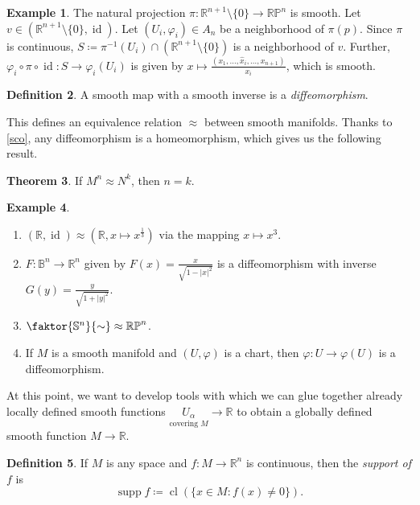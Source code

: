 \documentclass[10pt,letterpaper,cm]{nupset}
\theoremstyle{definition}
\newtheorem{definition}{Definition}[subsection]
\newtheorem{exmp}[definition]{Example}
\theoremstyle{theorem}
\newtheorem{theorem}[definition]{Theorem}
\theoremstyle{remark}
\newcommand{\R}{\mathbb R}
\newcommand{\RP}{\mathbb{RP}}
\renewcommand{\S}{\mathbb S}
\newcommand{\B}{\mathbb{B}}
\newcommand{\1}{\mathbf{1}}
\newcommand{\0}{\vec 0}
\DeclareMathOperator{\id}{id}
\DeclareMathOperator{\supp}{supp}
\DeclareMathOperator{\cl}{cl}
\begin{document}
\begin{exmp}
The natural projection $\pi : \R^{n+1}\setminus \{0\} \to \RP^n$ is smooth. Let $v \in \left(\R^{n+1} \setminus \{0\}, \id\right)$. Let $(U_i, \varphi_i) \in A_n$ be a neighborhood of $\pi(p)$. Since $\pi$ is continuous, $S \coloneqq  \pi^{-1}(U_i) \cap  (\R^{n+1} \setminus \{0\})$ is a neighborhood of $v$. Further, $\varphi_i \circ \pi \circ \id : S \to \varphi_i(U_i)$ is given by $x\mapsto \frac{(x_1, \ldots, \hat{x}_i, \ldots, x_{n+1})}{x_i}$, which is smooth.
\end{exmp}

\begin{definition} 
A smooth map with a smooth inverse is a \textit{diffeomorphism}.
\end{definition}

This defines an equivalence relation $\approx$ between smooth manifolds. Thanks to \cref{sco}, any diffeomorphism is a homeomorphism, which gives us the following result.

\begin{theorem} 
 If $M^n \approx N^k$, then $n =k$.
\end{theorem}


\begin{exmp} $ $
\begin{enumerate}
\item $\left(\R, \id\right) \approx \left(\R, x\mapsto x^{\frac{1}{3}}\right)$ via the mapping $ x \mapsto x^3$.
\item $F: \B^n \to \R^n$ given by $F(x) = \frac{x}{\sqrt{1-\lvert{x}\rvert^2}}$ is a diffeomorphism with inverse $G(y) = \frac{y}{\sqrt{1+\lvert{y}\rvert^2}}$.
\item  $\faktor{\S^n}{\sim} \approx \RP^n$.
\item If $M$ is a smooth manifold and $(U, \varphi)$ is a chart, then $\varphi: U \to \varphi(U)$ is a diffeomorphism.
\end{enumerate}
\end{exmp}


 \bigskip
 
 At this point, we want to develop tools with which we can glue together already locally defined smooth functions $\underset{\text{covering } M}{U_{\alpha}} \to \R$ to obtain a globally defined smooth function $M\to \R$.
 
\begin{definition}
If $M$ is any space and $f:M \to \R^n$ is continuous, then the \textit{support of $f$} is $$\supp f \coloneqq  \cl\left(\{x \in M: f(x) \ne 0\}\right).$$
\end{definition}
\end{document}
